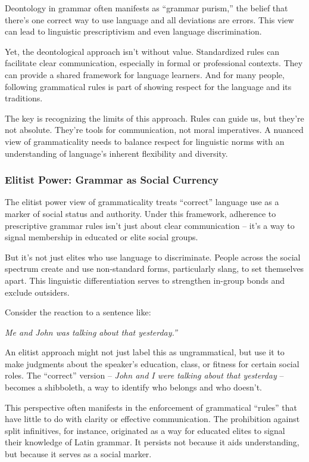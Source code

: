Deontology in grammar often manifests as ``grammar purism,'' the belief that there's one correct way to use language and all deviations are errors. This view can lead to linguistic prescriptivism and even language discrimination.

Yet, the deontological approach isn't without value. Standardized rules can facilitate clear communication, especially in formal or professional contexts. They can provide a shared framework for language learners. And for many people, following grammatical rules is part of showing respect for the language and its traditions.

The key is recognizing the limits of this approach. Rules can guide us, but they're not absolute. They're tools for communication, not moral imperatives. A nuanced view of grammaticality needs to balance respect for linguistic norms with an understanding of language's inherent flexibility and diversity.

\subsubsection{Elitist Power: Grammar as Social Currency}

The elitist power view of grammaticality treats ``correct'' language use as a marker of social status and authority. Under this framework, adherence to prescriptive grammar rules isn't just about clear communication -- it's a way to signal membership in educated or elite social groups.

But it's not just elites who use language to discriminate. People across the social spectrum create and use non-standard forms, particularly slang, to set themselves apart. This linguistic differentiation serves to strengthen in-group bonds and exclude outsiders.

Consider the reaction to a sentence like:

\ea
\textit{Me and John was talking about that yesterday.''}
\z

An elitist approach might not just label this as ungrammatical, but use it to make judgments about the speaker's education, class, or fitness for certain social roles. The ``correct'' version -- \textit{John and I were talking about that yesterday} -- becomes a shibboleth, a way to identify who belongs and who doesn't.

This perspective often manifests in the enforcement of grammatical ``rules'' that have little to do with clarity or effective communication. The prohibition against split infinitives, for instance, originated as a way for educated elites to signal their knowledge of Latin grammar. It persists not because it aids understanding, but because it serves as a social marker.

